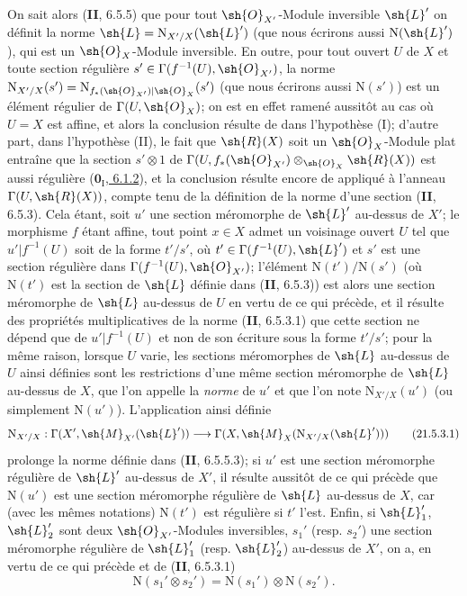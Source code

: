 \begin{env}[21.5.3]
On sait alors (\textbf{II}, 6.5.5) que pour tout $\sh{O}_{X'}$-Module inversible $\sh{L}'$ on définit la norme $\sh{L}=\mathrm{N}_{X'/X}(\sh{L}')$ (que nous écrirons aussi $\mathrm{N}(\sh{L}')$), qui est un $\sh{O}_X$-Module inversible.
En outre, pour tout ouvert $U$ de $X$ et toute section régulière $s'\in\Gamma(f^{-1}(U),\sh{O}_{X'})$, la norme $\mathrm{N}_{X'/X}(s')=\mathrm{N}_{f_*(\sh{O}_{X'})|\sh{O}_X}(s')$ (que nous écrirons aussi $\mathrm{N}(s')$) est un élément régulier de $\Gamma(U,\sh{O}_X)$;
on est en effet ramené aussitôt au cas où $U=X$ est affine, et alors la conclusion résulte de  dans l'hypothèse (I);
d'autre part, dans l'hypothèse (II), le fait que $\sh{R}(X)$ soit un $\sh{O}_X$-Module plat entraîne que la section $s'\otimes1$ de $\Gamma(U,f_*(\sh{O}_{X'})\otimes_{\sh{O}_X}\sh{R}(X))$ est aussi régulière (\hyperref[0.6.1.2]{$\mathbf{0}_{\mathrm I}$, 6.1.2}), et la conclusion résulte encore de  appliqué à l'anneau $\Gamma(U,\sh{R}(X))$, compte tenu de la définition de la norme d'une section (\textbf{II}, 6.5.3).
Cela étant, soit $u'$ une section méromorphe de $\sh{L}'$ au-dessus de $X'$;
le morphisme $f$ étant affine, tout point $x\in X$ admet un voisinage ouvert $U$ tel que $u'|f^{-1}(U)$ soit de la forme $t'/s'$, où $t'\in\Gamma(f^{-1}(U),\sh{L}')$ et $s'$ est une section régulière dans $\Gamma(f^{-1}(U),\sh{O}_{X'})$;
l'élément $\mathrm{N}(t')/\mathrm{N}(s')$ (où $\mathrm{N}(t')$ est la section de $\sh{L}$ définie dans (\textbf{II}, 6.5.3)) est alors une section méromorphe de $\sh{L}$ au-dessus de $U$ en vertu de ce qui précède, et il résulte des propriétés multiplicatives de la norme (\textbf{II}, 6.5.3.1) que cette section ne dépend que de $u'|f^{-1}(U)$ et non de son écriture sous la forme $t'/s'$;
pour la même raison, lorsque $U$ varie, les sections méromorphes de $\sh{L}$ au-dessus de $U$ ainsi définies sont les restrictions d'une même section méromorphe de $\sh{L}$ au-dessus de $X$, que l'on appelle la \emph{norme} de $u'$ et que l'on note $\mathrm{N}_{X'/X}(u')$ (ou simplement $\mathrm{N}(u')$).
L'application ainsi définie
\[
\label{IV.21.5.3.1}
  \mathrm{N}_{X'/X}:\Gamma(X',\sh{M}_{X'}(\sh{L}'))\to\Gamma(X,\sh{M}_X(\mathrm{N}_{X'/X}(\sh{L}')))
  \tag{21.5.3.1}
\]
prolonge la norme définie dans (\textbf{II}, 6.5.5.3);
si $u'$ est une section méromorphe régulière de $\sh{L}'$ au-dessus de $X'$, il résulte aussitôt de ce qui précède que $\mathrm{N}(u')$ est une section méromorphe régulière de $\sh{L}$ au-dessus de $X$, car (avec les mêmes notations) $\mathrm{N}(t')$ est régulière si $t'$ l'est.
Enfin, si $\sh{L}_1'$, $\sh{L}_2'$ sont deux $\sh{O}_{X'}$-Modules inversibles, $s_1'$ (resp. $s_2'$) une section méromorphe régulière de $\sh{L}_1'$ (resp. $\sh{L}_2'$) au-dessus de $X'$, on a, en vertu de ce qui précède et de (\textbf{II}, 6.5.3.1)
\[
\label{IV.21.5.3.2}
  \mathrm{N}(s_1'\otimes s_2')=\mathrm{N}(s_1')\otimes\mathrm{N}(s_2').
  \tag{21.5.3.2}
\]
\end{env}

